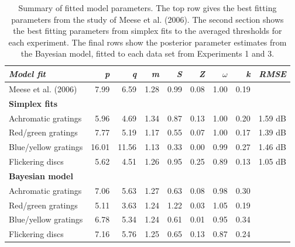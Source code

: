 \documentclass[
  letterpaper,
  DIV=11,
  numbers=noendperiod]{scrartcl}
\begin{document}
\hypertarget{tbl-parametertable}{}
\begin{table}
\caption{\label{tbl-parametertable}Summary of fitted model parameters. The top row gives the best fitting
parameters from the study of Meese et al. (2006). The second section
shows the best fitting parameters from simplex fits to the averaged
thresholds for each experiment. The final rows show the posterior
parameter estimates from the Bayesian model, fitted to each data set
from Experiments 1 and 3. }\tabularnewline

\centering
\begin{tabular}{lrrrrrrrr}
\toprule
\textbf{\em{Model fit}} & \textbf{\em{p}} & \textbf{\em{q}} & \textbf{\em{m}} & \textbf{\em{S}} & \textbf{\em{Z}} & \textbf{\em{$\omega$}} & \textbf{\em{k}} & \textbf{\em{RMSE}}\\
\midrule
Meese et al. (2006) & 7.99 & 6.59 & 1.28 & 0.99 & 0.08 & 1.00 & 0.19 & \\
\midrule
\textbf{Simplex fits} & \textbf{} & \textbf{} & \textbf{} & \textbf{} & \textbf{} & \textbf{} & \textbf{} & \textbf{}\\
Achromatic gratings & 5.96 & 4.69 & 1.34 & 0.87 & 0.13 & 1.00 & 0.20 & 1.59 dB\\
Red/green gratings & 7.77 & 5.19 & 1.17 & 0.55 & 0.07 & 1.00 & 0.17 & 1.39 dB\\
Blue/yellow gratings & 16.01 & 11.56 & 1.13 & 0.33 & 0.00 & 0.99 & 0.27 & 1.46 dB\\
Flickering discs & 5.62 & 4.51 & 1.26 & 0.95 & 0.25 & 0.89 & 0.13 & 1.05 dB\\
\midrule
\textbf{Bayesian model} & \textbf{} & \textbf{} & \textbf{} & \textbf{} & \textbf{} & \textbf{} & \textbf{} & \textbf{}\\
Achromatic gratings & 7.06 & 5.63 & 1.27 & 0.63 & 0.08 & 0.98 & 0.30 & \\
Red/green gratings & 5.11 & 3.63 & 1.24 & 1.22 & 0.03 & 1.05 & 0.19 & \\
Blue/yellow gratings & 6.78 & 5.34 & 1.24 & 0.61 & 0.01 & 0.95 & 0.34 & \\
Flickering discs & 7.16 & 5.76 & 1.25 & 0.65 & 0.13 & 0.87 & 0.24 & \\
\bottomrule
\end{tabular}
\end{table}
\end{document}
